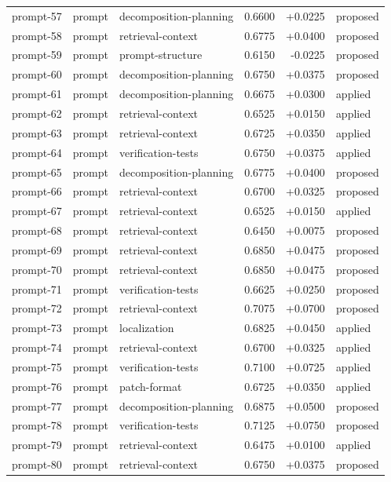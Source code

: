 \begin{center}
\begin{longtable}{llp{5.2cm}rrl}
prompt-57 & prompt & decomposition-planning & 0.6600 & +0.0225 & proposed \\
prompt-58 & prompt & retrieval-context & 0.6775 & +0.0400 & proposed \\
prompt-59 & prompt & prompt-structure & 0.6150 & -0.0225 & proposed \\
prompt-60 & prompt & decomposition-planning & 0.6750 & +0.0375 & proposed \\
prompt-61 & prompt & decomposition-planning & 0.6675 & +0.0300 & applied \\
prompt-62 & prompt & retrieval-context & 0.6525 & +0.0150 & applied \\
prompt-63 & prompt & retrieval-context & 0.6725 & +0.0350 & applied \\
prompt-64 & prompt & verification-tests & 0.6750 & +0.0375 & applied \\
prompt-65 & prompt & decomposition-planning & 0.6775 & +0.0400 & proposed \\
prompt-66 & prompt & retrieval-context & 0.6700 & +0.0325 & proposed \\
prompt-67 & prompt & retrieval-context & 0.6525 & +0.0150 & applied \\
prompt-68 & prompt & retrieval-context & 0.6450 & +0.0075 & proposed \\
prompt-69 & prompt & retrieval-context & 0.6850 & +0.0475 & proposed \\
prompt-70 & prompt & retrieval-context & 0.6850 & +0.0475 & proposed \\
prompt-71 & prompt & verification-tests & 0.6625 & +0.0250 & proposed \\
prompt-72 & prompt & retrieval-context & 0.7075 & +0.0700 & proposed \\
prompt-73 & prompt & localization & 0.6825 & +0.0450 & applied \\
prompt-74 & prompt & retrieval-context & 0.6700 & +0.0325 & applied \\
prompt-75 & prompt & verification-tests & 0.7100 & +0.0725 & applied \\
prompt-76 & prompt & patch-format & 0.6725 & +0.0350 & applied \\
prompt-77 & prompt & decomposition-planning & 0.6875 & +0.0500 & proposed \\
prompt-78 & prompt & verification-tests & 0.7125 & +0.0750 & proposed \\
prompt-79 & prompt & retrieval-context & 0.6475 & +0.0100 & applied \\
prompt-80 & prompt & retrieval-context & 0.6750 & +0.0375 & proposed \\

\end{longtable}
\end{center}
